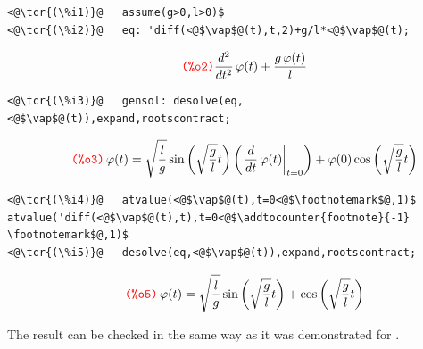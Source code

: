 \documentclass[../Maxima_Workbook.tex]{subfiles}
\begin{document}
\lz \begin{small}
\color{blue} \leqn
\begin{lstlisting}
<@\tcr{(\%i1)}@   assume(g>0,l>0)$
<@\tcr{(\%i2)}@   eq: 'diff(<@$\vap$@(t),t,2)+g/l*<@$\vap$@(t);
\end{lstlisting}
\vspace{-4mm} \[\tag*{\tcr{\ttfamily (\%o2)}} \frac{{{d}^{2}}}{d {{t}^{2}}} \operatorname{\vap }(t)+\frac{g \operatorname{\vap }(t)}{l} \]
\vspace{-5mm} \begin{lstlisting}
<@\tcr{(\%i3)}@   gensol: desolve(eq,<@$\vap$@(t)),expand,rootscontract;
\end{lstlisting}
\vspace{-4mm} \[\tag*{\tcr{\ttfamily (\%o3)}} \operatorname{\vap }(t)=\sqrt{\frac{l}{g}} \sin{\left( \sqrt{\frac{g}{l}} t\right) } \left( \left. \frac{d}{d t} \operatorname{\vap }(t)\right|_{t=0}\right) +\operatorname{\vap }(0) \cos{\left( \sqrt{\frac{g}{l}} t\right) } \]
\vspace{-5mm} \begin{lstlisting}
<@\tcr{(\%i4)}@   atvalue(<@$\vap$@(t),t=0<@$\footnotemark$@,1)$  atvalue('diff(<@$\vap$@(t),t),t=0<@$\addtocounter{footnote}{-1} \footnotemark$@,1)$
<@\tcr{(\%i5)}@   desolve(eq,<@$\vap$@(t)),expand,rootscontract;
\end{lstlisting}
\vspace{-4mm} \[\tag*{\tcr{\ttfamily (\%o5)}} \operatorname{\vap }(t)=\sqrt{\frac{l}{g}} \sin{\left( \sqrt{\frac{g}{l}} t\right) }+\cos{\left( \sqrt{\frac{g}{l}} t\right) } \]
\color{black} \reqn
\end{small} \vspace{-4mm}

\lz The result can be checked in the same way as it was demonstrated for .
\end{document}

